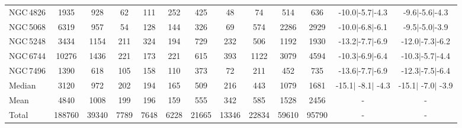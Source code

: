 \begin{table*}
\begin{center}
\begin{tabular}{lcccccccccccc}
NGC\,4826 & 1935 & 928 & 62 & 111 & 252 & 425 & 48 & 74 & 514 & 636 & -10.0$\vert$-5.7$\vert$-4.3 & -9.6$\vert$-5.6$\vert$-4.3 \\ 
NGC\,5068 & 6319 & 957 & 54 & 128 & 144 & 326 & 69 & 574 & 2286 & 2929 & -10.0$\vert$-6.8$\vert$-6.1 & -9.5$\vert$-5.0$\vert$-3.9 \\ 
NGC\,5248 & 3434 & 1154 & 211 & 324 & 194 & 729 & 232 & 506 & 1192 & 1930 & -13.2$\vert$-7.7$\vert$-6.9 & -12.0$\vert$-7.3$\vert$-6.2 \\ 
NGC\,6744 & 10276 & 1436 & 221 & 173 & 221 & 615 & 393 & 1122 & 3079 & 4594 & -10.3$\vert$-6.9$\vert$-6.4 & -10.3$\vert$-5.7$\vert$-4.4 \\ 
NGC\,7496 & 1390 & 618 & 105 & 158 & 110 & 373 & 72 & 211 & 452 & 735 & -13.6$\vert$-7.7$\vert$-6.9 & -12.3$\vert$-7.5$\vert$-6.4 \\ 
\hline
Median & 3120 & 972 & 202 & 194 & 165 & 509 & 216 & 443 & 1079 & 1681 & -15.1$\vert$ -8.1$\vert$ -4.3 & -15.1$\vert$ -7.0$\vert$ -3.9 \\ 
Mean & 4840 & 1008 & 199 & 196 & 159 & 555 & 342 & 585 & 1528 & 2456 & - & - \\ 
Total & 188760 & 39340 & 7789 & 7648 & 6228 & 21665 & 13346 & 22834 & 59610 & 95790 & - & - \\ 
\hline
\hline
\end{tabular} 
\end{center}
\end{table*}
%